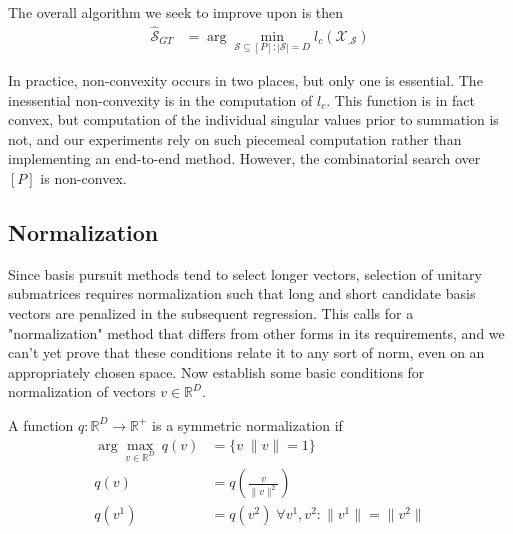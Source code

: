 The overall algorithm we seek to improve upon is then
\begin{align}
\label{prog:ground_truth}
\widehat {\mathcal S}_{GT}  &= \arg \min_{\mathcal S \subseteq [P] : |\mathcal S| = D} l_c (\mathcal X_{.\mathcal S})
\end{align}

In practice, non-convexity occurs in two places, but only one is essential.
The inessential non-convexity is in the computation of $l_c$.
This function is in fact convex, but computation of the individual singular values prior to summation is not, and our experiments rely on such piecemeal computation rather than implementing an end-to-end method.
However, the combinatorial search over $[P]$ is non-convex.


\subsection{Normalization}
\label{sec:normalization}

Since basis pursuit methods tend to select longer vectors, selection of unitary submatrices requires normalization such that long and short candidate basis vectors are penalized in the subsequent regression.
This calls for a "normalization" method that differs from other forms in its requirements, and we can't yet prove that these conditions relate it to any sort of norm, even on an appropriately chosen space.
Now establish some basic conditions for normalization of vectors $v \in \mathbb R^D$.

\begin{definition}
A function $q: \mathbb R^D \to \mathbb R^+ $ is a symmetric normalization if 
\begin{align}
\arg \max_{v \in \mathbb R^D} \ q (v) &=\{ v \; \|v\| = 1 \} \\
q(v) &= q(\frac{v}{\|v\|^2}) \\
q(v^1) &= q(v^2) \; \forall v^1, v^2 : \|v^1\| = \|v^2\|
\end{align}
\label{cond:normalization}
\end{definition}

